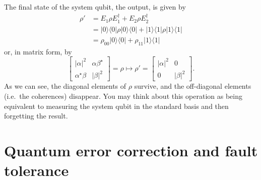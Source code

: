 \documentclass[fleqn]{article}
\let\oldsection\section
\renewcommand\section{\clearpage\oldsection}
\begin{document}
The final state of the system qubit, the output, is given by
\[
  \begin{aligned}
    \rho'
    &= E_1\rho E_1^\dagger + E_2\rho E_2^\dagger
  \\&= |0\rangle\langle 0|\rho|0\rangle\langle 0| + |1\rangle\langle 1|\rho|1\rangle\langle 1|
  \\&= \rho_{00}|0\rangle\langle 0|+\rho_{11}|1\rangle\langle 1|
  \end{aligned}
\]
or, in matrix form, by
\[
  \begin{bmatrix}
    |\alpha|^2 & \alpha\beta^\star
  \\\alpha^\star\beta & |\beta|^2
  \end{bmatrix}
  =\rho
  \longmapsto
  \rho'=
  \begin{bmatrix}
    |\alpha|^2 & 0
  \\0 & |\beta|^2
  \end{bmatrix}.
\]
As we can see, the diagonal elements of \(\rho\) survive, and the off-diagonal elements (i.e.~the coherences) disappear.
You may think about this operation as being equivalent to measuring the system qubit in the standard basis and then forgetting the result.

\hypertarget{chapter11}{%
\section{Quantum error correction and fault tolerance}\label{chapter11}}
\end{document}

